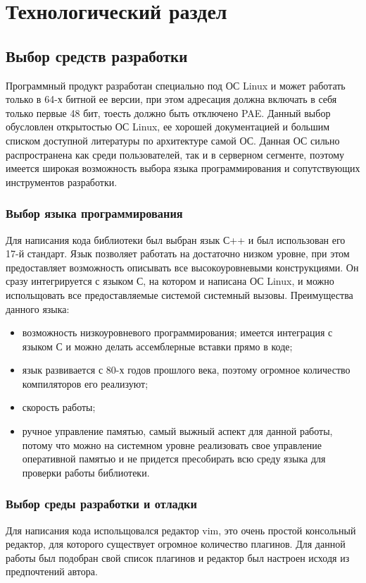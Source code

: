 \chapter{Технологический раздел}
\section{Выбор средств разработки}
Программный продукт разработан специально под ОС Linux и может работать только в 64-х битной ее версии, при этом адресация должна включать в себя только первые 48 бит, тоесть должно быть отключено PAE. Данный выбор обусловлен открытостью ОС Linux, ее хорошей документацией и большим списком доступной литературы по архитектуре самой ОС. Данная ОС сильно распространена как среди пользователей, так и в серверном сегменте, поэтому имеется широкая возможность выбора языка программирования и сопутствующих инструментов разработки.

\subsection{Выбор языка программирования}
Для написания кода библиотеки был выбран язык С++ и был использован его 17-й стандарт. Язык позволяет работать на достаточно низком уровне, при этом предоставляет возможность описывать все высокоуровневыми конструкциями. Он сразу интегрируется с языком С, на котором и написана ОС Linux, и можно испольщовать все предоставляемые системой системный вызовы. Преимущества данного языка:
\begin{itemize}
	\item возможность низкоуровневого программирования; имеется интеграция с языком С и можно делать ассемблерные вставки прямо в коде;
	\item язык развивается с 80-х годов прошлого века, поэтому огромное количество компиляторов его реализуют;
	\item скорость работы;
	\item ручное управление памятью, самый выжный аспект для данной работы, потому что можно на системном уровне реализовать свое управление оперативной памятью и не придется пресобирать всю среду языка для проверки работы библиотеки.
\end{itemize}

\subsection{Выбор среды разработки и отладки}
Для написания кода испольщовался редактор vim, это очень простой консольный редактор, для которого существует огромное количество плагинов. Для данной работы был подобран свой список плагинов и редактор был настроен исходя из предпочтений автора.

